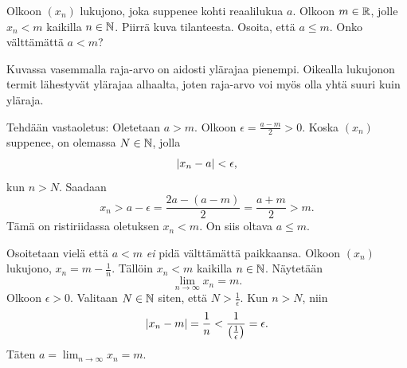 \documentclass[12pt,a4paper]{article}
\begin{document}
\begin{exercise}
  Olkoon \((x_n)\) lukujono, joka suppenee kohti reaalilukua \(a\). Olkoon
  \(m \in \mathbb{R}\), jolle \(x_n < m\) kaikilla \(n \in \mathbb{N}\). Piirrä
  kuva tilanteesta. Osoita, että \(a \leq m\). Onko välttämättä
  \(a < m\)?
\end{exercise}

\begin{solution}
  Kuvassa vasemmalla raja-arvo on aidosti ylärajaa pienempi. Oikealla
  lukujonon termit lähestyvät ylärajaa alhaalta, joten raja-arvo voi myös olla
  yhtä suuri kuin yläraja.
  \begin{center}
  \end{center}

  Tehdään vastaoletus: Oletetaan \(a > m\). Olkoon \(\epsilon =
  \frac{a - m}{2} > 0\). Koska \((x_n)\) suppenee, on olemassa \(N \in \mathbb{N}\),
  jolla
  \[
    \lvert x_n - a\rvert < \epsilon,
  \]
  kun \(n > N\). Saadaan
  \[
    x_n > a - \epsilon = \frac{2a - (a - m)}{2} = \frac{a + m}{2} > m.
  \]
  Tämä on ristiriidassa oletuksen \(x_n < m\). On siis oltava
  \(a \leq m\).

  Osoitetaan vielä että \(a < m\) \emph{ei} pidä välttämättä paikkaansa.
  Olkoon \((x_n)\) lukujono, \(x_n = m - \frac{1}{n}\). Tällöin
  \(x_n < m\) kaikilla \(n \in \mathbb{N}\). Näytetään
  \[
    \lim_{n \to \infty} x_n = m.
  \]
  Olkoon \(\epsilon > 0\). Valitaan \(N \in \mathbb{N}\) siten, että
  \(N > \frac{1}{\epsilon}\). Kun \(n > N\), niin
  \[
    \lvert x_n - m\rvert = \frac{1}{n} <
    \frac{1}{\bigl(\frac{1}{\epsilon}\bigr)} = \epsilon.
  \]
  Täten \(a = \lim_{n \to \infty} x_n = m\).
\end{solution}
\end{document}
